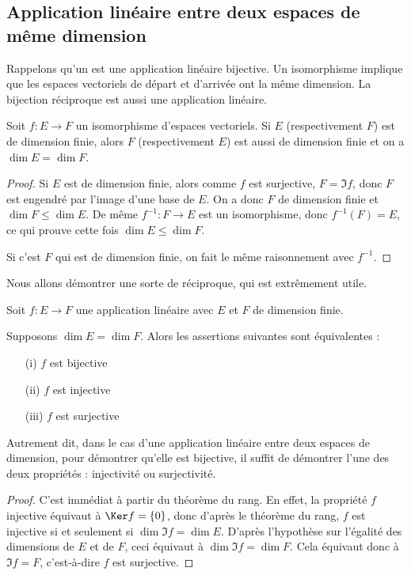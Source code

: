 \documentclass[class=report,crop=false]{standalone}
\begin{document}
\subsection{Application linéaire entre deux espaces de même dimension}

Rappelons qu'un  est une application linéaire bijective.
Un isomorphisme implique que les espaces vectoriels de départ et d'arrivée ont la même
dimension. La bijection réciproque est aussi une application linéaire.
\begin{proposition}
Soit $f : E \to F$ un isomorphisme d'espaces vectoriels.
Si $E$ (respectivement $F$) est de dimension finie, alors
$F$ (respectivement $E$) est aussi de dimension finie
et on a $\dim E =\dim F$.
\end{proposition}

\begin{proof}
Si $E$ est de dimension finie, alors comme $f$ est surjective, $F=\Im f$, donc $F$ est
engendré par l'image d'une base de $E$. On a donc $F$ de dimension finie et
$\dim F \le \dim E$. De même
$f^{-1} : F \to E$ est un isomorphisme, donc $f^{-1} (F) = E$,
ce qui prouve cette fois $\dim E \le \dim F$.

Si c'est $F$ qui est de dimension finie, on fait le même raisonnement
avec $f^{-1}$.
\end{proof}



Nous allons démontrer une sorte de réciproque, qui est extrêmement utile.
\begin{theoreme}
\label{th:eqapplinbij}
Soit $f : E \to F$ une application linéaire avec $E$ et $F$
de dimension finie.

Supposons $\dim E = \dim F$. Alors
les assertions suivantes sont équivalentes :
\begin{itemize}
  \item[(i)] $f$ est bijective
  \item[(ii)] $f$ est injective
  \item[(iii)] $f$ est surjective
\end{itemize}
\end{theoreme}

Autrement dit, dans le cas d'une application linéaire entre deux
espaces de  dimension, pour démontrer qu'elle est
bijective, il suffit de démontrer l'une des deux propriétés : injectivité
ou surjectivité.

\begin{proof}
C'est immédiat à partir du théorème du rang. En effet, la propriété
$f$ injective équivaut à $\Ker f = \{0\}$, donc d'après le théorème du rang,
$f$ est injective si et seulement si $\dim \Im f =\dim
E$. D'après l'hypothèse sur l'égalité des dimensions de $E$ et de $F$,
ceci équivaut à $\dim \Im f=\dim F$. Cela équivaut donc à $\Im f =F$, c'est-à-dire
$f$ est surjective.
\end{proof}
\end{document}

